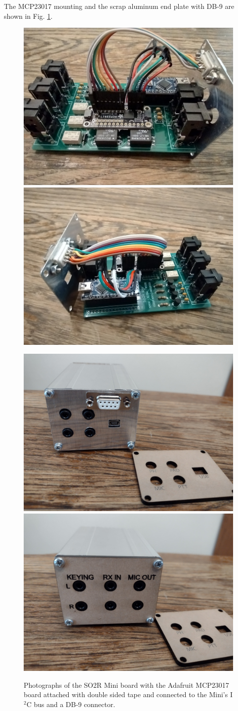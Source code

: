 \documentclass[12pt]{article}
\begin{document}
The MCP23017 mounting and the scrap aluminum end plate with
DB-9  are shown in
Fig. \ref{f1.mcp23017_mount}.
\begin{figure}
\includegraphics[width=.5\textwidth]{Adafruit_MCP23017_mounted_1.jpg}
\includegraphics[width=.5\textwidth]{i2c_plug_and_db9_1.jpg}

\includegraphics[width=.5\textwidth]{db9_position_1.jpg}
\includegraphics[width=.5\textwidth]{opposite_end_1.jpg}

\caption{Photographs of the SO2R Mini board with the Adafruit MCP23017
board attached with double sided tape and connected to the Mini's
I$^2$C bus and a DB-9 connector.
}
\label{f1.mcp23017_mount}
\end{figure}
\end{document}
